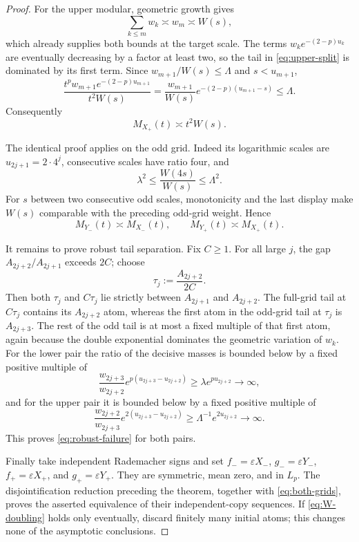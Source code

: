 \documentclass[11pt]{article}
\theoremstyle{definition}
\theoremstyle{remark}
\newcommand{\asympc}{\mathrel{\asymp}}
\begin{document}
\begin{proof}
For the upper modular, geometric growth gives
\begin{equation}\label{eq:upper-head}
  \sum_{k\leq m}w_k\asympc w_m\asympc W(s),
\end{equation}
which already supplies both bounds at the target scale.  The terms
$w_ke^{-(2-p)u_k}$ are eventually decreasing by a factor at least two, so the
tail in \eqref{eq:upper-split} is dominated by its first term.  Since
$w_{m+1}/W(s)\leq\Lambda$ and $s<u_{m+1}$,
\[
  \frac{t^p w_{m+1}e^{-(2-p)u_{m+1}}}{t^2W(s)}
  =\frac{w_{m+1}}{W(s)}e^{-(2-p)(u_{m+1}-s)}
  \leq\Lambda.
\]
Consequently
\begin{equation}\label{eq:upper-result}
  M_{X_+}(t)\asympc t^2W(s).
\end{equation}

The identical proof applies on the odd grid.  Indeed its logarithmic scales
are $u_{2j+1}=2\cdot4^j$, consecutive scales have ratio four, and
\[
  \lambda^2\leq \frac{W(4s)}{W(s)}\leq\Lambda^2.
\]
For $s$ between two consecutive odd scales, monotonicity and the last display
make $W(s)$ comparable with the preceding odd-grid weight.  Hence
\begin{equation}\label{eq:both-grids}
  M_{Y_-}(t)\asympc M_{X_-}(t),
  \qquad M_{Y_+}(t)\asympc M_{X_+}(t).
\end{equation}

It remains to prove robust tail separation.  Fix $C\geq1$.  For all large
$j$, the gap $A_{2j+2}/A_{2j+1}$ exceeds $2C$; choose
\[
  \tau_j:=\frac{A_{2j+2}}{2C}.
\]
Then both $\tau_j$ and $C\tau_j$ lie strictly between $A_{2j+1}$ and
$A_{2j+2}$.  The full-grid tail at $C\tau_j$ contains its $A_{2j+2}$ atom,
whereas the first atom in the odd-grid tail at $\tau_j$ is $A_{2j+3}$.
The rest of the odd tail is at most a fixed multiple of that first atom,
again because the double exponential dominates the geometric variation of
$w_k$.  For the lower pair the ratio of the decisive masses is bounded below
by a fixed positive multiple of
\[
  \frac{w_{2j+3}}{w_{2j+2}}
  e^{p(u_{2j+3}-u_{2j+2})}
  \geq \lambda e^{p u_{2j+2}}\longrightarrow\infty,
\]
and for the upper pair it is bounded below by a fixed positive multiple of
\[
  \frac{w_{2j+2}}{w_{2j+3}}
  e^{2(u_{2j+3}-u_{2j+2})}
  \geq \Lambda^{-1}e^{2u_{2j+2}}\longrightarrow\infty.
\]
This proves \eqref{eq:robust-failure} for both pairs.

Finally take independent Rademacher signs and set
$f_-=\varepsilon X_-$, $g_-=\varepsilon Y_-$,
$f_+=\varepsilon X_+$, and $g_+=\varepsilon Y_+$.  They are symmetric,
mean zero, and in $L_p$.  The disjointification reduction preceding the
theorem, together with \eqref{eq:both-grids}, proves the asserted equivalence
of their independent-copy sequences.  If \eqref{eq:W-doubling} holds only
eventually, discard finitely many initial atoms; this changes none of the
asymptotic conclusions.
\end{proof}
\end{document}
